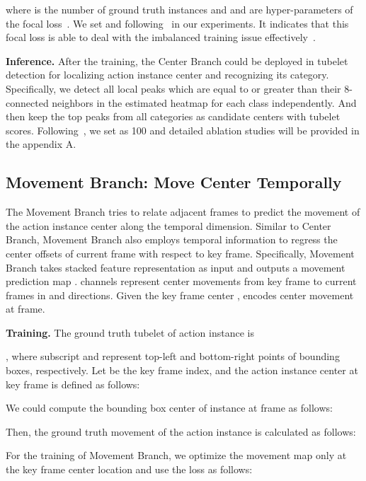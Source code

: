 \documentclass[runningheads]{llncs}
\begin{document}
where  is the number of ground truth instances and  and  are hyper-parameters of the focal loss~\cite{lin2017focal}. We set  and  following~\cite{CornerNet,CenterNet} in our experiments. It indicates that this focal loss is able to deal with the imbalanced training issue effectively~\cite{lin2017focal}.

\textbf{Inference.} After the training, the Center Branch could be deployed in tubelet detection for localizing action instance center and recognizing its category. Specifically, we detect all local peaks which are equal to or greater than their 8-connected neighbors in the estimated heatmap  for each class independently. And then keep the top  peaks from all categories as candidate centers with tubelet scores.
Following~\cite{CenterNet}, we set  as 100 and detailed ablation studies will be provided in the appendix A.

\subsection{Movement Branch: Move Center Temporally}\label{sec:movementBranch}
\label{sec:movement}

The Movement Branch tries to relate adjacent frames to predict the movement of the action instance center along the temporal dimension. Similar to Center Branch, Movement Branch also employs temporal information to regress the center offsets of current frame with respect to key frame. Specifically, Movement Branch takes stacked feature representation as input and outputs a movement prediction map .  channels represent center movements from key frame to current frames in  and  directions. Given the key frame center ,  encodes center movement at  frame.

\textbf{Training.} The ground truth tubelet of  action instance is \begin{footnotesize}


\noindent 
\end{footnotesize}
, where subscript  and  represent top-left and bottom-right points of bounding boxes, respectively. Let  be the key frame index, and the  action instance center at key frame is defined as follows:

We could compute the bounding box center  of  instance at  frame as follows:

Then, the ground truth movement of the  action instance is calculated as follows:

For the training of Movement Branch, we optimize the movement map  only at the key frame center location and use the  loss as follows:
\end{document}
